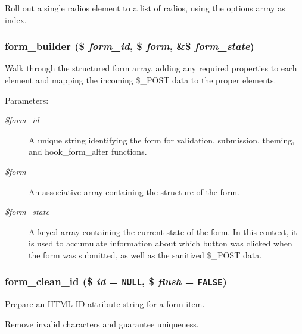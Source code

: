 Roll out a single radios element to a list of radios, using the options array as index. \hypertarget{group__form__api_g52d4df482bbb0b49c23061cd715adf63}{
\subsubsection[{form\_\-builder}]{\setlength{\rightskip}{0pt plus 5cm}form\_\-builder (\$ {\em form\_\-id}, \/  \$ {\em form}, \/  \&\$ {\em form\_\-state})}}
\label{group__form__api_g52d4df482bbb0b49c23061cd715adf63}


Walk through the structured form array, adding any required properties to each element and mapping the incoming \$\_\-POST data to the proper elements.

\begin{Desc}
\item[Parameters:]
\begin{description}
\item[{\em \$form\_\-id}]A unique string identifying the form for validation, submission, theming, and hook\_\-form\_\-alter functions. \item[{\em \$form}]An associative array containing the structure of the form. \item[{\em \$form\_\-state}]A keyed array containing the current state of the form. In this context, it is used to accumulate information about which button was clicked when the form was submitted, as well as the sanitized \$\_\-POST data. \end{description}
\end{Desc}
\hypertarget{group__form__api_gf71edb864be3bf0e932a96f1464c63bf}{
\subsubsection[{form\_\-clean\_\-id}]{\setlength{\rightskip}{0pt plus 5cm}form\_\-clean\_\-id (\$ {\em id} = {\tt NULL}, \/  \$ {\em flush} = {\tt FALSE})}}
\label{group__form__api_gf71edb864be3bf0e932a96f1464c63bf}


Prepare an HTML ID attribute string for a form item.

Remove invalid characters and guarantee uniqueness.

